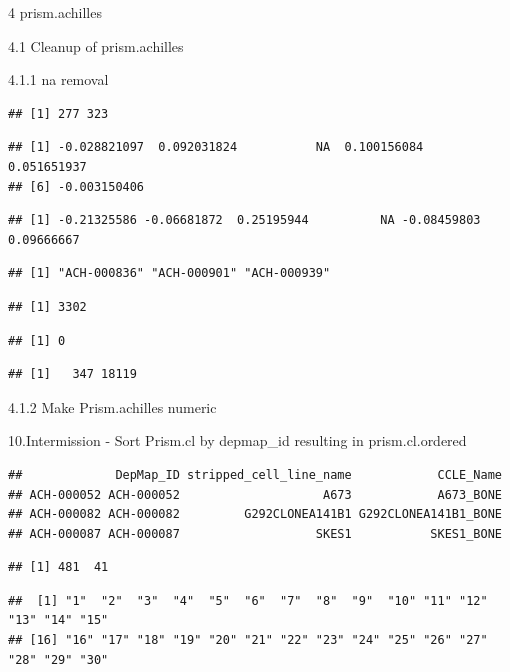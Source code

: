 \documentclass[
]{article}
\begin{document}
4 prism.achilles

4.1 Cleanup of prism.achilles

4.1.1 na removal

\begin{verbatim}
## [1] 277 323
\end{verbatim}

\begin{verbatim}
## [1] -0.028821097  0.092031824           NA  0.100156084  0.051651937
## [6] -0.003150406
\end{verbatim}

\begin{verbatim}
## [1] -0.21325586 -0.06681872  0.25195944          NA -0.08459803  0.09666667
\end{verbatim}

\begin{verbatim}
## [1] "ACH-000836" "ACH-000901" "ACH-000939"
\end{verbatim}

\begin{verbatim}
## [1] 3302
\end{verbatim}

\begin{verbatim}
## [1] 0
\end{verbatim}

\begin{verbatim}
## [1]   347 18119
\end{verbatim}

4.1.2 Make Prism.achilles numeric

10.Intermission - Sort Prism.cl by depmap\_id resulting in
prism.cl.ordered

\begin{verbatim}
##             DepMap_ID stripped_cell_line_name            CCLE_Name
## ACH-000052 ACH-000052                    A673            A673_BONE
## ACH-000082 ACH-000082         G292CLONEA141B1 G292CLONEA141B1_BONE
## ACH-000087 ACH-000087                   SKES1           SKES1_BONE
\end{verbatim}

\begin{verbatim}
## [1] 481  41
\end{verbatim}

\begin{verbatim}
##  [1] "1"  "2"  "3"  "4"  "5"  "6"  "7"  "8"  "9"  "10" "11" "12" "13" "14" "15"
## [16] "16" "17" "18" "19" "20" "21" "22" "23" "24" "25" "26" "27" "28" "29" "30"
\end{verbatim}
\end{document}
